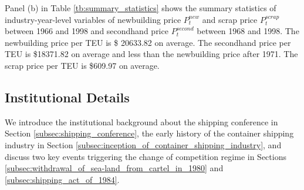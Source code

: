 \documentclass[11pt]{article}
\begin{document}
Panel (b) in Table \ref{tb:summary_statistics} shows the summary statistics of industry-year-level variables of newbuilding price $P_{t}^{new}$ and scrap price $P_{t}^{scrap}$ between 1966 and 1998 and secondhand price $P_{t}^{second}$ between 1968 and 1998. The newbuilding price per TEU is \$ 20633.82 on average. The secondhand price per TEU is \$18371.82 on average and less than the newbuilding price after 1971. The scrap price per TEU is \$609.97 on average.

\subsection{Institutional Details}\label{subsec:institutional_details}

We introduce the institutional background about the shipping conference in Section \ref{subsec:shipping_conference}, the early history of the container shipping industry in Section \ref{subsec:inception_of_container_shipping_industry}, and discuss two key events triggering the change of competition regime in Sections \ref{subsec:withdrawal_of_sea-land_from_cartel_in_1980} and \ref{subsec:shipping_act_of_1984}.
\end{document}
